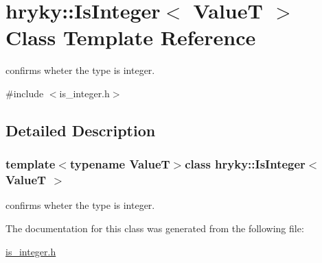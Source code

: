 \hypertarget{classhryky_1_1_is_integer}{\section{hryky\-:\-:Is\-Integer$<$ Value\-T $>$ Class Template Reference}
\label{classhryky_1_1_is_integer}
}


confirms wheter the type is integer.  




{\ttfamily \#include $<$is\-\_\-integer.\-h$>$}



\subsection{Detailed Description}
\subsubsection*{template$<$typename Value\-T$>$class hryky\-::\-Is\-Integer$<$ Value\-T $>$}

confirms wheter the type is integer. 

The documentation for this class was generated from the following file\-:\begin{DoxyCompactItemize}
\item 
\hyperlink{is__integer_8h}{is\-\_\-integer.\-h}\end{DoxyCompactItemize}
